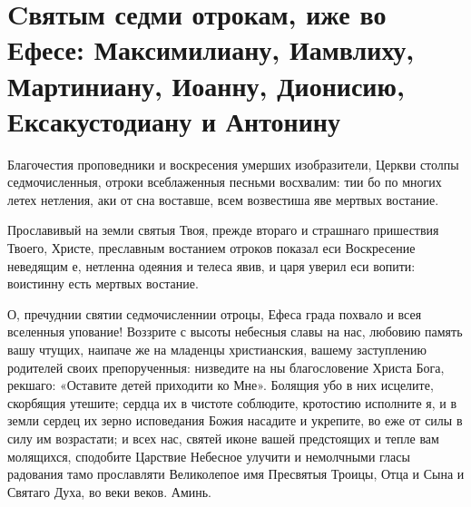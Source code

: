 \section{Cвятым седми отрокам, иже во Ефесе: Максимилиану, Иамвлиху, Мартиниану, Иоанну, Дионисию, Ексакустодиану и Антонину}\begin{mymulticols}


Благочестия проповедники и воскресения умерших изобразители, Церкви столпы седмочисленныя, отроки всеблаженныя песньми восхвалим: тии бо по многих летех нетления, аки от сна воставше, всем возвестиша яве мертвых востание.


Прославивый на земли святыя Твоя, прежде втораго и страшнаго пришествия Твоего, Христе, преславным востанием отроков показал еси Воскресение неведящим е, нетленна одеяния и телеса явив, и царя уверил еси вопити: воистинну есть мертвых востание.


О, пречуднии святии седмочисленнии отроцы, Ефеса града похвало и всея вселенныя упование! Воззрите с высоты небесныя славы на нас, любовию память вашу чтущих, наипаче же на младенцы христианския, вашему заступлению родителей своих препорученныя: низведите на ны благословение Христа Бога, рекшаго: «Оставите детей приходити ко Мне». Болящия убо в них исцелите, скорбящия утешите; сердца их в чистоте соблюдите, кротостию исполните я, и в земли сердец их зерно исповедания Божия насадите и укрепите, во еже от силы в силу им возрастати; и всех нас, святей иконе вашей предстоящих и тепле вам молящихся, сподобите Царствие Небесное улучити и немолчными гласы радования тамо прославляти Великолепое имя Пресвятыя Троицы, Отца и Сына и Святаго Духа, во веки веков. Аминь.

\end{mymulticols}

